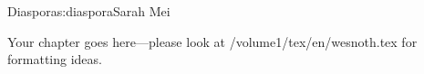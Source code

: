 \begin{aosachapter}{Diaspora}{s:diaspora}{Sarah Mei}

Your chapter goes here---please look at /volume1/tex/en/wesnoth.tex for 
formatting ideas.

\end{aosachapter}
